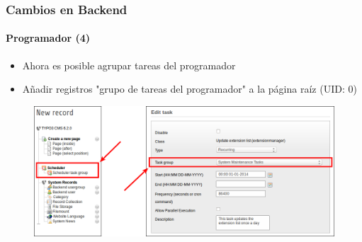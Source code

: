 \begin{frame}[fragile]
	\frametitle{Cambios en Backend}
    	\framesubtitle{Programador (4)}

	\begin{itemize}
		\item Ahora es posible agrupar tareas del programador
		\item Añadir registros "grupo de tareas del programador" a la página raíz (UID: 0)
	\end{itemize}

	\begin{figure}
		\includegraphics[width=0.85\linewidth]{Images/BackendChanges/SchedulerTaskGroup.png}
	\end{figure}

\end{frame}


